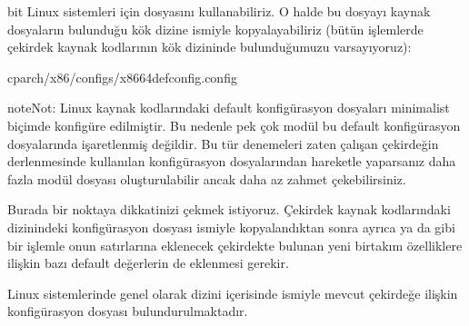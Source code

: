 \documentclass[a4paper,10pt,turkish]{sphinxmanual}
\begin{document}
 bit Linux sistemleri için  dosyasını kullanabiliriz. O halde bu dosyayı
kaynak dosyaların bulunduğu kök dizine  ismiyle kopyalayabiliriz (bütün işlemlerde
çekirdek kaynak kodlarının kök dizininde bulunduğumuzu varsayıyoruz):

\begin{sphinxVerbatim}[commandchars=\\\{\}]
\PYGZdl{}cparch/x86/configs/x86\PYGZus{}64\PYGZus{}defconfig.config
\end{sphinxVerbatim}

\begin{sphinxadmonition}{note}{Not:}
\sphinxAtStartPar
Linux kaynak kodlarındaki default konfigürasyon dosyaları minimalist biçimde konfigüre
edilmiştir. Bu nedenle pek çok modül bu default konfigürasyon dosyalarında işaretlenmiş değildir.
Bu tür denemeleri zaten çalışan çekirdeğin derlenmesinde kullanılan konfigürasyon dosyalarından
hareketle yaparsanız daha fazla modül dosyası oluşturulabilir ancak daha az zahmet çekebilirsiniz.
\end{sphinxadmonition}

\sphinxAtStartPar
Burada bir noktaya dikkatinizi çekmek istiyoruz. Çekirdek kaynak kodlarındaki
 dizinindeki  konfigürasyon dosyası 
ismiyle kopyalandıktan sonra ayrıca  ya da  gibi bir işlemle
onun satırlarına eklenecek çekirdekte bulunan yeni birtakım özelliklere ilişkin bazı default
değerlerin de eklenmesi gerekir.

\sphinxAtStartPar
Linux sistemlerinde genel olarak  dizini içerisinde  ismiyle
mevcut çekirdeğe ilişkin konfigürasyon dosyası bulundurulmaktadır.
\end{document}
